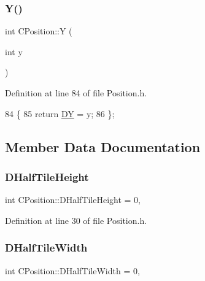 \subsubsection{\texorpdfstring{Y()}{Y()}\hspace{0.1cm}{\footnotesize\ttfamily [2/2]}}
{\footnotesize\ttfamily int C\+Position\+::Y (\begin{DoxyParamCaption}\item[{int}]{y }\end{DoxyParamCaption})\hspace{0.3cm}{\ttfamily [inline]}}



Definition at line 84 of file Position.\+h.


\begin{DoxyCode}
84                     \{
85             \textcolor{keywordflow}{return} \hyperlink{classCPosition_a84139c9e8eb547e7cf3cb851739943a4}{DY} = y;
86         \};
\end{DoxyCode}


\subsection{Member Data Documentation}
\hypertarget{classCPosition_a1e0af68f7690b3cfc14687cf7fbe7ade}{}\label{classCPosition_a1e0af68f7690b3cfc14687cf7fbe7ade} 
\subsubsection{\texorpdfstring{D\+Half\+Tile\+Height}{DHalfTileHeight}}
{\footnotesize\ttfamily int C\+Position\+::\+D\+Half\+Tile\+Height = 0\hspace{0.3cm}{\ttfamily [static]}, {\ttfamily [protected]}}



Definition at line 30 of file Position.\+h.

\hypertarget{classCPosition_a3227e835d9008346e9d91bdad2380f14}{}\label{classCPosition_a3227e835d9008346e9d91bdad2380f14} 
\subsubsection{\texorpdfstring{D\+Half\+Tile\+Width}{DHalfTileWidth}}
{\footnotesize\ttfamily int C\+Position\+::\+D\+Half\+Tile\+Width = 0\hspace{0.3cm}{\ttfamily [static]}, {\ttfamily [protected]}}



